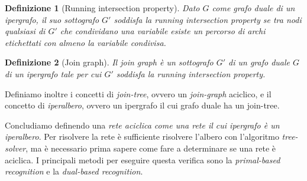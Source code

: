 \documentclass[a4paper, 11pt]{article}
\newtheorem{definit}{Definizione}[subsection]
\begin{document}
\begin{definit}[Running intersection property]
	Dato $G$ come grafo duale di un ipergrafo, il suo sottografo $G'$ soddisfa la running intersection property se tra nodi qualsiasi di $G'$ che condividano una variabile esiste un percorso di archi etichettati con almeno la variabile condivisa.
\end{definit}

\begin{definit}[Join graph]
	Il join graph è un sottografo $G'$ di un grafo duale $G$ di un ipergrafo tale per cui $G'$ soddisfa la running intersection property.
\end{definit}

Definiamo inoltre i concetti di \textit{join-tree}, ovvero un \textit{join-graph} aciclico, e il concetto di \textit{iperalbero}, ovvero un ipergrafo il cui grafo duale ha un join-tree.

Concludiamo definendo una \textit{rete aciclica come una rete il cui ipergrafo è un iperalbero}. 
Per risolvere la rete è sufficiente risolvere l'albero con l'algoritmo \textit{tree-solver}, ma è necessario prima sapere come fare a determinare se una rete è aciclica. I principali metodi per eseguire questa verifica sono la \textit{primal-based recognition} e la \textit{dual-based recognition}.
\end{document}
